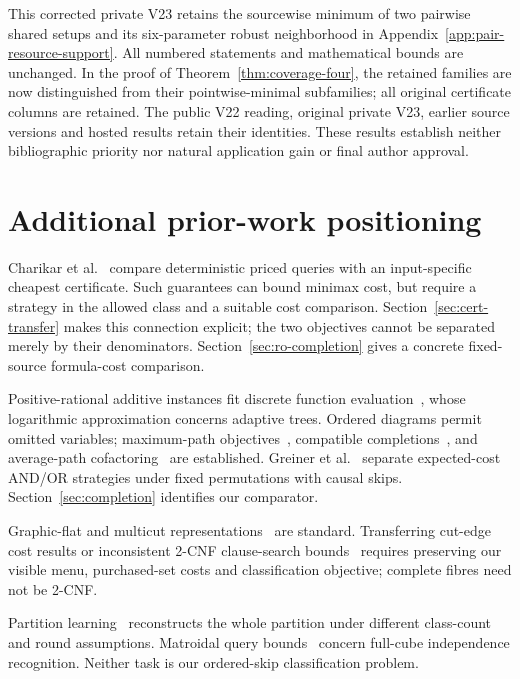 \documentclass[pdflatex,sn-mathphys-num]{sn-jnl}
\theoremstyle{thmstyleone}
\theoremstyle{thmstylethree}
\theoremstyle{thmstyletwo}
\begin{document}
This corrected private V23 retains the sourcewise minimum of two
pairwise shared setups and its six-parameter robust neighborhood in
Appendix~\ref{app:pair-resource-support}. All numbered statements and
mathematical bounds are unchanged. In the proof of
Theorem~\ref{thm:coverage-four}, the retained families are now distinguished
from their pointwise-minimal subfamilies; all original certificate
columns are retained. The public V22 reading, original private V23,
earlier source versions and hosted results retain their identities.
These results establish neither bibliographic priority nor natural
application gain or final author approval.




\section{Additional prior-work positioning}\label{app:additional-positioning}
Charikar et al.~\cite{charikar02} compare deterministic priced queries with an input-specific cheapest certificate. Such guarantees can bound minimax cost, but require a strategy in the allowed class and a suitable cost comparison. Section~\ref{sec:cert-transfer} makes this connection explicit; the two objectives cannot be separated merely by their denominators. Section~\ref{sec:ro-completion} gives a concrete fixed-source formula-cost comparison.

Positive-rational additive instances fit discrete function evaluation~\cite{cicalese14}, whose logarithmic approximation concerns adaptive trees. Ordered diagrams permit omitted variables; maximum-path objectives~\cite{ebendt06,ebendt05}, compatible completions~\cite{oliveira,sasao}, and average-path cofactoring~\cite{jiang} are established. Greiner et al.~\cite{greiner} separate expected-cost AND/OR strategies under fixed permutations with causal skips. Section~\ref{sec:completion} identifies our comparator.

Graphic-flat and multicut representations~\cite{berczi,hornakova} are standard. Transferring cut-edge cost results or inconsistent 2-CNF clause-search bounds~\cite{lovasz} requires preserving our visible menu, purchased-set costs and classification objective; complete fibres need not be 2-CNF.

Partition learning~\cite{liu,black} reconstructs the whole partition under different class-count and round assumptions. Matroidal query bounds~\cite{kulkarni} concern full-cube independence recognition. Neither task is our ordered-skip classification problem.
\end{document}
